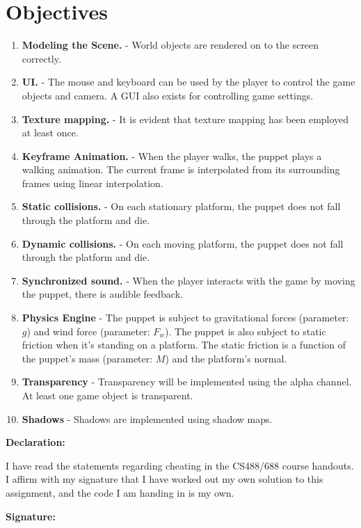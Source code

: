 \documentclass[11pt]{report}
\begin{document}
\printbibliography
\newpage
\section{Objectives}
\begin{enumerate}
\item \textbf{Modeling the Scene.} - World objects are rendered on to the screen correctly.
\item \textbf{UI.} - The mouse and keyboard can be used by the player to control the game objects and camera. A GUI also exists for controlling game settings.
\item \textbf{Texture mapping.} - It is evident that texture mapping has been employed at least once.
\item \textbf{Keyframe Animation.} - When the player walks, the puppet plays a walking animation. The current frame is interpolated from its surrounding frames using linear interpolation.
\item \textbf{Static collisions.} - On each stationary platform, the puppet does not fall through the platform and die.
\item \textbf{Dynamic collisions.} - On each moving platform, the puppet does not fall through the platform and die.
\item \textbf{Synchronized sound.} - When the player interacts with the game by moving the puppet, there is audible feedback.
\item \textbf{Physics Engine} - The puppet is subject to gravitational forces (parameter: $g$) and wind force (parameter: $F_w$). The puppet is also subject to static friction when it's standing on a platform. The static friction is a function of the puppet's mass (parameter: $M$) and the platform's normal.
\item \textbf{Transparency} - Transparency will be implemented using the alpha channel. At least one game object is transparent.
\item \textbf{Shadows} - Shadows are implemented using shadow maps.
\end{enumerate}

\textbf{Declaration:}

I have read the statements regarding cheating in the CS488/688 course handouts. I affirm with my signature that I have worked out my own solution to this assignment, and the code I am handing in is my own.

\textbf{Signature:}
\end{document}
